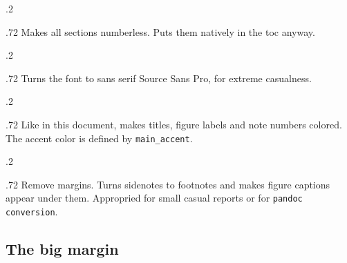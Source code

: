 \documentclass[raggedright, twoside, 11pt, colorful]{tufte-style-article}
\begin{document}
\smallskip
\begin{minipagewithmarginpars}[t]{.2\textwidth}
	\raggedleft
\end{minipagewithmarginpars}\hfill%
\begin{minipagewithmarginpars}[t]{.72\textwidth}
	Makes all sections numberless. Puts them natively in the toc anyway.
\end{minipagewithmarginpars}
\smallskip
\begin{minipagewithmarginpars}[t]{.2\textwidth}
	\raggedleft
\end{minipagewithmarginpars}\hfill%
\begin{minipagewithmarginpars}[t]{.72\textwidth}
	Turns the font to sans serif Source Sans Pro, for extreme casualness.
\end{minipagewithmarginpars}
\smallskip
\begin{minipagewithmarginpars}[t]{.2\textwidth}
	\raggedleft
\end{minipagewithmarginpars}\hfill%
\begin{minipagewithmarginpars}[t]{.72\textwidth}
	Like in this document, makes titles, figure labels and note numbers colored. The accent color is defined by \texttt{main\_accent}.
\end{minipagewithmarginpars}
\smallskip
\begin{minipagewithmarginpars}[t]{.2\textwidth}
	\raggedleft
\end{minipagewithmarginpars}\hfill%
\begin{minipagewithmarginpars}[t]{.72\textwidth}
	Remove margins. Turns sidenotes to footnotes and makes figure captions appear under them. Appropried for small casual reports or for \texttt{pandoc conversion}.
\end{minipagewithmarginpars}


\newpage

\subsection{The big margin}
\end{document}
